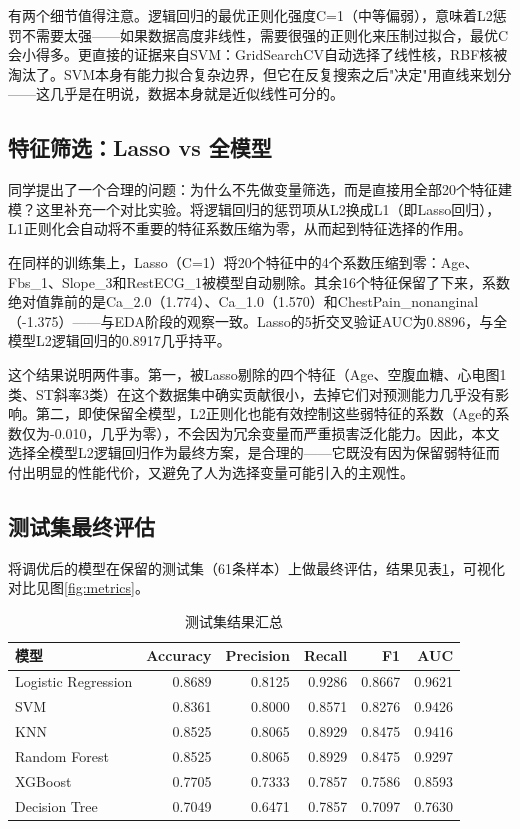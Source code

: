\documentclass[12pt,a4paper]{ctexart}
\begin{document}
有两个细节值得注意。逻辑回归的最优正则化强度C=1（中等偏弱），意味着L2惩罚不需要太强——如果数据高度非线性，需要很强的正则化来压制过拟合，最优C会小得多。更直接的证据来自SVM：GridSearchCV自动选择了线性核，RBF核被淘汰了。SVM本身有能力拟合复杂边界，但它在反复搜索之后"决定"用直线来划分——这几乎是在明说，数据本身就是近似线性可分的。

\subsection{特征筛选：Lasso vs 全模型}

同学提出了一个合理的问题：为什么不先做变量筛选，而是直接用全部20个特征建模？这里补充一个对比实验。将逻辑回归的惩罚项从L2换成L1（即Lasso回归），L1正则化会自动将不重要的特征系数压缩为零，从而起到特征选择的作用。

在同样的训练集上，Lasso（C=1）将20个特征中的4个系数压缩到零：Age、Fbs\_1、Slope\_3和RestECG\_1被模型自动剔除。其余16个特征保留了下来，系数绝对值靠前的是Ca\_2.0（1.774）、Ca\_1.0（1.570）和ChestPain\_nonanginal（-1.375）——与EDA阶段的观察一致。Lasso的5折交叉验证AUC为0.8896，与全模型L2逻辑回归的0.8917几乎持平。

这个结果说明两件事。第一，被Lasso剔除的四个特征（Age、空腹血糖、心电图1类、ST斜率3类）在这个数据集中确实贡献很小，去掉它们对预测能力几乎没有影响。第二，即使保留全模型，L2正则化也能有效控制这些弱特征的系数（Age的系数仅为-0.010，几乎为零），不会因为冗余变量而严重损害泛化能力。因此，本文选择全模型L2逻辑回归作为最终方案，是合理的——它既没有因为保留弱特征而付出明显的性能代价，又避免了人为选择变量可能引入的主观性。

\subsection{测试集最终评估}

将调优后的模型在保留的测试集（61条样本）上做最终评估，结果见表\ref{tab:final-results}，可视化对比见图\ref{fig:metrics}。

\begin{table}[H]
\centering
\caption{测试集结果汇总}
\label{tab:final-results}
\small
\begin{tabular}{lrrrrr}
\toprule
\textbf{模型} & \textbf{Accuracy} & \textbf{Precision} & \textbf{Recall} & \textbf{F1} & \textbf{AUC} \\
\midrule
Logistic Regression & 0.8689 & 0.8125 & 0.9286 & 0.8667 & 0.9621 \\
SVM                 & 0.8361 & 0.8000 & 0.8571 & 0.8276 & 0.9426 \\
KNN                 & 0.8525 & 0.8065 & 0.8929 & 0.8475 & 0.9416 \\
Random Forest       & 0.8525 & 0.8065 & 0.8929 & 0.8475 & 0.9297 \\
XGBoost             & 0.7705 & 0.7333 & 0.7857 & 0.7586 & 0.8593 \\
Decision Tree       & 0.7049 & 0.6471 & 0.7857 & 0.7097 & 0.7630 \\
\bottomrule
\end{tabular}
\end{table}
\end{document}
